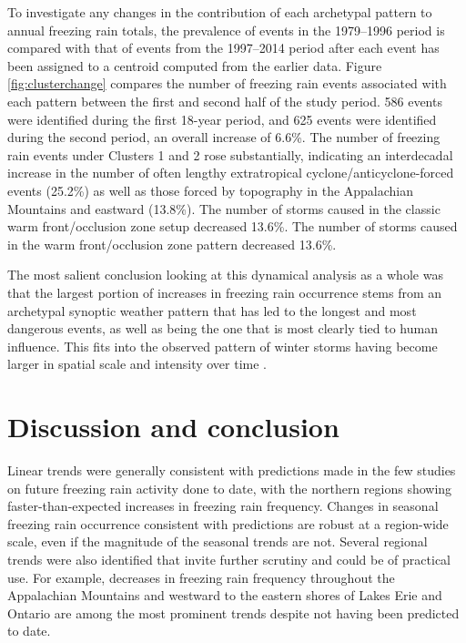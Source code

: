 \documentclass[twocol]{ametsoc}
\begin{document}
To investigate any changes in the contribution of each archetypal pattern to annual freezing rain totals, the prevalence of events in the 1979--1996 period is compared with that of events from the 1997--2014 period after each event has been assigned to a centroid computed from the earlier data. Figure \ref{fig:clusterchange} compares the number of freezing rain events associated with each pattern between the first and second half of the study period. 586 events were identified during the first 18-year period, and 625 events were identified during the second period, an overall increase of 6.6\%. The number of freezing rain events under Clusters 1 and 2  rose substantially, indicating an interdecadal increase in the number of often lengthy extratropical cyclone/anticyclone-forced events (25.2\%) as well as those forced by topography in the Appalachian Mountains and eastward (13.8\%). The number of storms caused in the classic warm front/occlusion zone setup decreased 13.6\%.  The number of storms caused in the warm front/occlusion zone pattern decreased 13.6\%. 

The most salient conclusion looking at this dynamical analysis as a whole was that the largest portion of increases in freezing rain occurrence stems from an archetypal synoptic weather pattern that has led to the longest and most dangerous events, as well as being the one that is most clearly tied to human influence. This fits into the observed pattern of winter storms having become larger in spatial scale and intensity over time \citep{changnon2007catastrophic}. 


\section{Discussion and conclusion}
Linear trends were generally consistent with predictions made in the few studies on future freezing rain activity done to date, with the northern regions showing faster-than-expected increases in freezing rain frequency. Changes in seasonal freezing rain occurrence consistent with predictions are robust at a region-wide scale, even if the magnitude of the seasonal trends are not. Several regional trends were also identified that invite further scrutiny and could be of practical use. For example, decreases in freezing rain frequency throughout the Appalachian Mountains and westward to the eastern shores of Lakes Erie and Ontario are among the most prominent trends despite not having been predicted to date. 
\end{document}
